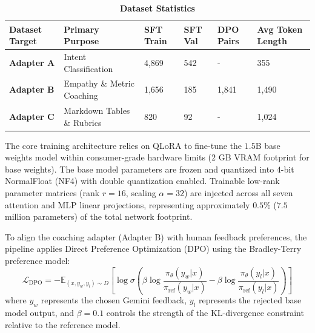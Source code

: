 \documentclass[12pt, a4paper]{report}
\begin{document}
\begin{table}[H]
    \centering
    \caption[Dataset Statistics]{\textbf{Dataset Statistics}}
    \vspace{0.2cm}
    \normalsize
    \renewcommand{\arraystretch}{1.3}
    \begin{tabularx}{\textwidth}{Z{1.1} | Z{1.7} | Z{0.8} | Z{0.8} | Z{0.8} | Z{0.8}}
    \hline\hline
    Dataset Target & Primary Purpose & SFT Train & SFT Val & DPO Pairs & Avg Token Length \\
    \hline
    \textbf{Adapter A} & Intent Classification & 4,869 & 542 & - & 355 \\
    \textbf{Adapter B} & Empathy \& Metric Coaching & 1,656 & 185 & 1,841 & 1,490 \\
    \textbf{Adapter C} & Markdown Tables \& Rubrics & 820 & 92 & - & 1,024 \\
    \hline\hline
    \end{tabularx}
\end{table}

\vspace{0.6cm}
\vspace{0.4cm}

\vspace{0.3cm}

The core training architecture relies on QLoRA to fine-tune the $1.5$B base weights model within consumer-grade hardware limits ($2$ GB VRAM footprint for base weights). The base model parameters are frozen and quantized into $4$-bit NormalFloat (NF4) with double quantization enabled. Trainable low-rank parameter matrices (rank $r=16$, scaling $\alpha=32$) are injected across all seven attention and MLP linear projections, representing approximately $0.5\%$ ($7.5$ million parameters) of the total network footprint.

\vspace{0.3cm}

To align the coaching adapter (Adapter B) with human feedback preferences, the pipeline applies Direct Preference Optimization (DPO) using the Bradley-Terry preference model:
\begin{equation*}
\mathcal{L}_{\text{DPO}} = -\mathbb{E}_{(x, y_w, y_l) \sim D} \left[ \log \sigma \left( \beta \log \frac{\pi_\theta(y_w|x)}{\pi_{\text{ref}}(y_w|x)} - \beta \log \frac{\pi_\theta(y_l|x)}{\pi_{\text{ref}}(y_l|x)} \right) \right]
\end{equation*}
where $y_w$ represents the chosen Gemini feedback, $y_l$ represents the rejected base model output, and $\beta=0.1$ controls the strength of the KL-divergence constraint relative to the reference model.
\end{document}
